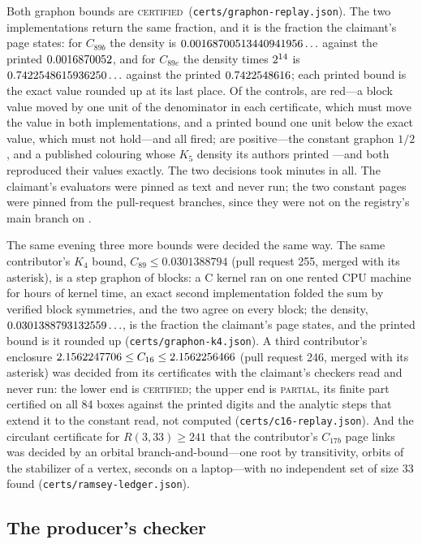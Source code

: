 \documentclass[preprint,11pt,authoryear,a4paper]{elsarticle}
\newcommand{\vword}[1]{{\normalfont\scshape #1}}
\newcommand{\vC}{\vword{certified}}
\begin{document}
Both graphon bounds are \vC\ (\texttt{certs/graphon-replay.json}). The two implementations return the same fraction, and it is the fraction the claimant's page states: for $C_{89b}$ the density is $0.00168700513440941956\ldots$ against the printed $0.0016870052$, and for $C_{89c}$ the density times $2^{14}$ is $0.7422548615936250\ldots$ against the printed $0.7422548616$; each printed bound is the exact value rounded up at its last place. Of the controls, \OcGnReds{} are red---a block value moved by one unit of the denominator in each certificate, which must move the value in both implementations, and a printed bound one unit below the exact value, which must not hold---and all fired; \OcGnPositives{} are positive---the constant graphon $1/2$, and a published colouring whose $K_5$ density its authors printed \citep{PPSS22}---and both reproduced their values exactly. The two decisions took \OcGnMinutes{} minutes in all. The claimant's evaluators were pinned as text and never run; the two constant pages were pinned from the pull-request branches, since they were not on the registry's main branch on \OcGnPosted.


The same evening three more bounds were decided the same way. The same contributor's $K_4$ bound, $C_{89}\le 0.0301388794$ (pull request 255, merged with its asterisk), is a step graphon of \OcKfBlocks{} blocks: a C kernel ran on one rented CPU machine for \OcKfPodHours{} hours of kernel time, an exact second implementation folded the sum by verified block symmetries, and the two agree on every block; the density, $0.0301388793132559\ldots$, is the fraction the claimant's page states, and the printed bound is it rounded up (\texttt{certs/graphon-k4.json}). A third contributor's enclosure $2.1562247706\le C_{16}\le2.1562256466$ (pull request 246, merged with its asterisk) was decided from its certificates with the claimant's checkers read and never run: the lower end is \vC; the upper end is \textsc{partial}, its finite part certified on all 84 boxes against the printed digits and the analytic steps that extend it to the constant read, not computed (\texttt{certs/c16-replay.json}). And the circulant certificate for $R(3,33)\ge241$ that the contributor's $C_{17b}$ page links was decided by an orbital branch-and-bound---one root by transitivity, \OcRtOrbits{} orbits of the stabilizer of a vertex, \OcRtSeconds{} seconds on a laptop---with no independent set of size 33 found (\texttt{certs/ramsey-ledger.json}).

\subsection{The producer's checker}\label{sec:checker}
\end{document}
